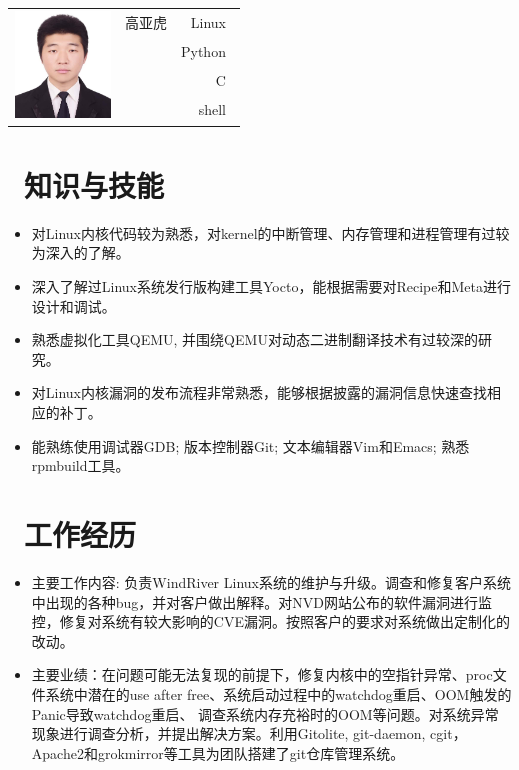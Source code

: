 \documentclass{resume}
\begin{document}
\Large{
  \begin{tabu}{ c l r }
     & \scshape{高亚虎} & {Linux~} \\
    &  & {Python~} \\
    &  & {C~} \\
    &  & {shell~}
  \end{tabu}
}
\section{\faGraduationCap\ 知识与技能}\normalsize
\begin{itemize}
  \item {对Linux内核代码较为熟悉，对kernel的中断管理、内存管理和进程管理有过较为深入的了解。}
  \item {深入了解过Linux系统发行版构建工具Yocto，能根据需要对Recipe和Meta进行设计和调试。}
  \item {熟悉虚拟化工具QEMU, 并围绕QEMU对动态二进制翻译技术有过较深的研究。}
  \item {对Linux内核漏洞的发布流程非常熟悉，能够根据披露的漏洞信息快速查找相应的补丁。}
  \item {能熟练使用调试器GDB; 版本控制器Git; 文本编辑器Vim和Emacs; 熟悉rpmbuild工具。}
\end{itemize}

\section{\faUsers\ 工作经历}\normalsize
{}
\begin{itemize}
  \item {主要工作内容: 负责WindRiver Linux系统的维护与升级。调查和修复客户系统中出现的各种bug，并对客户做出解释。对NVD网站公布的软件漏洞进行监控，修复对系统有较大影响的CVE漏洞。按照客户的要求对系统做出定制化的改动。}
\item {主要业绩：在问题可能无法复现的前提下，修复内核中的空指针异常、proc文件系统中潜在的use after free、系统启动过程中的watchdog重启、OOM触发的Panic导致watchdog重启、 调查系统内存充裕时的OOM等问题。对系统异常现象进行调查分析，并提出解决方案。利用Gitolite, git-daemon, cgit，Apache2和grokmirror等工具为团队搭建了git仓库管理系统。}
  \end{itemize}
\end{document}
